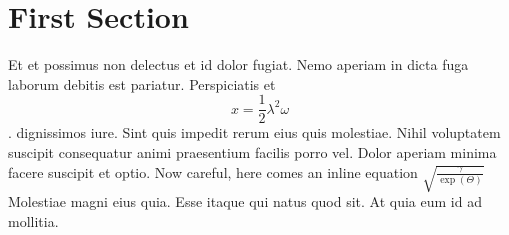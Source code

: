 \documentclass{article}
\begin{document}
	\section{First Section}
		Et et possimus non delectus et id dolor fugiat. Nemo aperiam in
		dicta fuga laborum debitis est pariatur.  Perspiciatis et
		\begin{equation}
		    x = \frac{1}{2} \lambda^2 \omega
		\end{equation}.
		dignissimos iure. Sint quis impedit rerum eius quis molestiae.
		Nihil voluptatem suscipit consequatur animi praesentium facilis
		porro vel. Dolor aperiam minima facere suscipit et optio.
		Now careful, here comes an inline equation $\sqrt{\frac{\gamma}{\exp(\Theta)}}$
		Molestiae magni eius quia. Esse itaque qui natus quod sit. At
		quia eum id ad mollitia.
\end{document}

